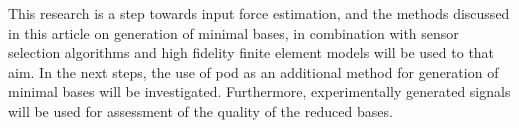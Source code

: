 This research is a step towards input force estimation, and the methods discussed in this article on generation of minimal bases, in combination with sensor selection algorithms and high fidelity finite element models will be used to that aim. In the next steps, the use of \gls{pod} as an additional method for generation of minimal bases will be investigated. Furthermore, experimentally generated signals will be used for assessment of the quality of the reduced bases. 


\cleardoublepage

